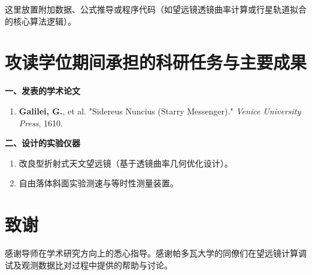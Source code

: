 \documentclass[a4paper,zihao=-4,twoside,openany,fontset=none]{ctexbook}
\begin{document}
这里放置附加数据、公式推导或程序代码（如望远镜透镜曲率计算或行星轨道拟合的核心算法逻辑）。

\clearpage

\printbibliography[heading=bibintoc, title=参考文献]
\clearpage

\fancyfoot[C]{} 

\chapter*{攻读学位期间承担的科研任务与主要成果}

\noindent\textbf{一、发表的学术论文}
\begin{enumerate}
    \item \textbf{Galilei, G.}, et al. "Sidereus Nuncius (Starry Messenger)." \textit{Venice University Press}, 1610.
\end{enumerate}

\vspace{1em}
\noindent\textbf{二、设计的实验仪器}
\begin{enumerate}
    \item 改良型折射式天文望远镜（基于透镜曲率几何优化设计）。
    \item 自由落体斜面实验测速与等时性测量装置。
\end{enumerate}

\clearpage

\chapter*{致谢}

感谢导师在学术研究方向上的悉心指导。感谢帕多瓦大学的同僚们在望远镜计算调试及观测数据比对过程中提供的帮助与讨论。
\end{document}
